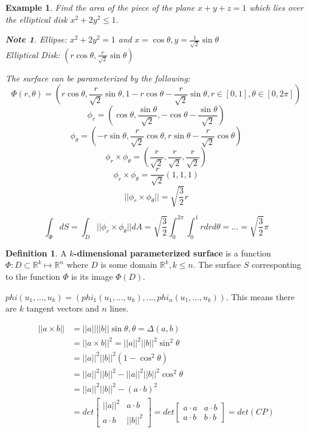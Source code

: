 \documentclass[12pt]{article}
\theoremstyle{plain}
\newtheorem*{note}{Note}
\newtheorem{example}[theorem]{Example}
\theoremstyle{definition}
\newtheorem{definition}[theorem]{Definition}
\begin{document}
\begin{example}
	Find the area of the piece of the plane $x+y+z=1$ which lies over the elliptical disk $x^2 + 2y^2 \leq 1$.\\
	\begin{note}
		Ellipse: $x^2 + 2y^2 = 1$ and $x=\cos\theta, y=\frac{1}{\sqrt{2}} \sin\theta$\\
		Elliptical Disk: $(r\cos\theta, \frac{r}{\sqrt{2}} \sin\theta)$
	\end{note}
	The surface can be parameterized by the following:
	$$\Phi (r,\theta) = (r\cos\theta, \frac{r}{\sqrt{2}} \sin\theta, 1-r\cos\theta-\frac{r}{\sqrt{2}} \sin\theta, r \in [0,1], \theta \in [0,2\pi])$$
	$$\phi_r = (\cos\theta, \frac{\sin\theta}{\sqrt{2}}, -\cos\theta - \frac{\sin\theta}{\sqrt{2}})$$
	$$\phi_\theta = (-r\sin\theta, \frac{r}{\sqrt{2}} \cos\theta, r\sin\theta - \frac{r}{\sqrt{2}} \cos\theta)$$
	$$\phi_r \times \phi_\theta = (\frac{r}{\sqrt{2}},\frac{r}{\sqrt{2}},\frac{r}{\sqrt{2}})$$
	$$\phi_r \times \phi_\theta = \frac{r}{\sqrt{2}} (1,1,1)$$
	$$||\phi_r \times \phi_\theta|| = \sqrt{\frac{3}{2}} r$$

	$$\int_\Phi dS = \int_D ||\phi_r \times \phi_\theta|| dA = \sqrt{\frac{3}{2}} \int^{2\pi}_0 \int^1_0 rdrd\theta = ... = \sqrt{\frac{3}{2}} \pi$$
\end{example}

\begin{definition}
 A \textbf{$k$-dimensional parameterized surface} is a function $\Phi: D \subset \mathbb{R}^k \mapsto \mathbb{R}^n$ where $D$ is some domain $\mathbb{R}^k, k\leq n$. The surface $S$ corresponting to the function $\Phi$ is its image $\Phi (D)$.
\end{definition}

$phi (u_1, ..., u_k) = (phi_1 (u_1, ..., u_k), ..., phi_n (u_1, ..., u_k))$. This means there are $k$ tangent vectors and $n$ lines.

\begin{align*}
	||a \times b|| &= ||a||||b||\sin\theta, \theta = \Delta (a,b)\\
	&= ||a \times b||^2 = ||a||^2||b||^2\sin^2\theta\\
	&= ||a||^2||b||^2 (1-\cos^2 \theta)\\
	&= ||a||^2||b||^2 - ||a||^2||b||^2\cos^2 \theta\\
	&= ||a||^2||b||^2 - (a\cdot b)^2\\
	&= det\begin{bmatrix}
||a||^2 & a\cdot b \\
a\cdot b & ||b||^2
\end{bmatrix} =
det\begin{bmatrix}
a\cdot a & a\cdot b \\
a\cdot b & b\cdot b
\end{bmatrix} = det(CP)
\end{align*}
\end{document}

